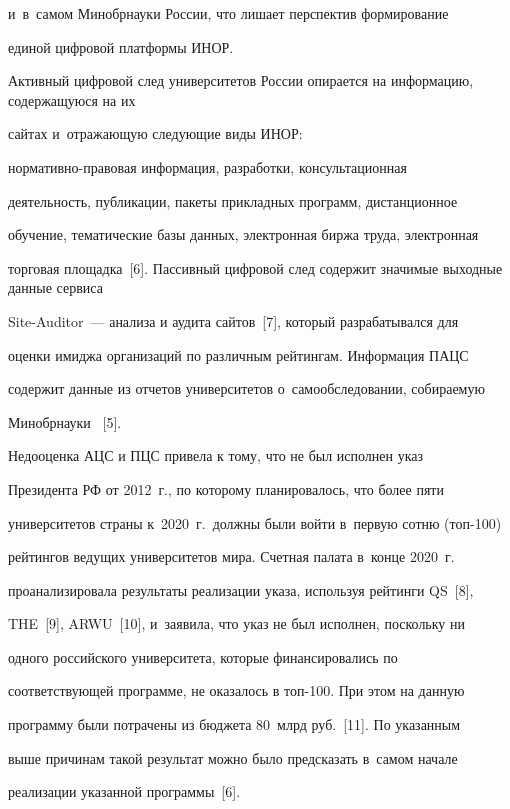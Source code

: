 и~в~самом Минобрнауки России, что лишает перспектив формирование 


единой цифровой платформы ИНОР.


  


  Активный цифровой след университетов России опирается на информацию, содержащуюся на их 


сайтах и~от\-ра\-жа\-ющую сле\-ду\-ющие виды ИНОР:  


нор\-ма\-тив\-но-пра\-во\-вая информация, разработки, консультационная 


деятельность, пуб\-ли\-ка\-ции, пакеты при\-клад\-ных программ, дистанционное 


обучение, тематические базы данных, электронная бир\-жа труда, электронная 


торговая площадка~[6]. Пассивный циф\-ро\-вой след содержит значимые выходные данные сервиса 


Site-Auditor~--- анализа и аудита сайтов~[7], который разрабатывался для 


оценки имиджа организаций по различным рейтингам. Информация ПАЦС 


содержит данные из отчетов университетов о~самообследовании, собираемую 


Минобрнауки~ [5]. 


  


  Недооценка АЦС и ПЦС привела к тому, что не был исполнен указ 


Президента РФ от 2012~г., по которому планировалось, что более пяти 


университетов страны к~2020~г.\ должны были войти в~первую сотню (топ-100) 


рейтингов ведущих университетов мира. Счетная палата в~конце 2020~г.\ 


проанализировала результаты реализации указа, используя рейтинги QS~[8], 


THE~[9], ARWU~[10], и~заявила, что указ не был исполнен, поскольку ни 


одного российского университета, которые финансировались по 


соответствующей программе, не оказалось в топ-100. При этом на данную 


программу были потрачены из бюджета 80~млрд руб.~[11]. По указанным 


выше причинам такой результат можно было предсказать в~самом начале 


реализации указанной программы~[6]. 


